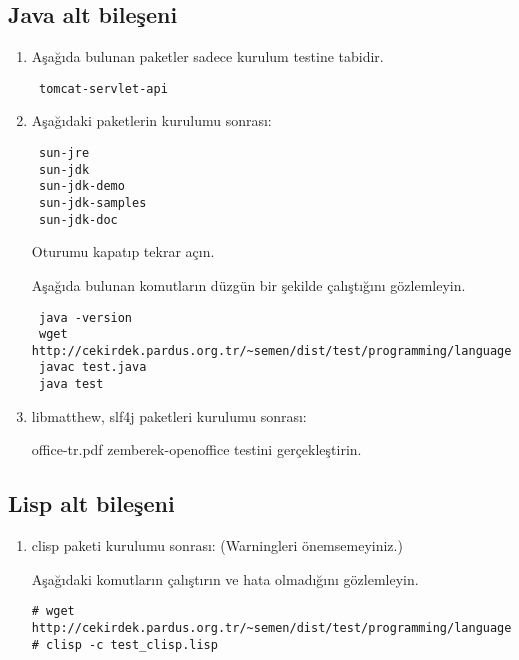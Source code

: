 \documentclass[a4paper,10pt]{article}
\begin{document}
\subsection{Java alt bileşeni}
\begin{enumerate}
\item Aşağıda bulunan paketler sadece kurulum testine tabidir.

\begin{verbatim}
 tomcat-servlet-api
\end{verbatim}

 \item Aşağıdaki paketlerin kurulumu sonrası:
\begin{verbatim}
 sun-jre
 sun-jdk
 sun-jdk-demo
 sun-jdk-samples
 sun-jdk-doc
\end{verbatim}

Oturumu kapatıp tekrar açın.

Aşağıda bulunan komutların düzgün bir şekilde çalıştığını gözlemleyin.
\begin{verbatim}
 java -version
 wget http://cekirdek.pardus.org.tr/~semen/dist/test/programming/language/java/test.java
 javac test.java
 java test
\end{verbatim}

\item libmatthew, slf4j paketleri kurulumu sonrası:

office-tr.pdf zemberek-openoffice testini gerçekleştirin.
\end{enumerate}



\subsection{Lisp alt bileşeni}
\begin{enumerate}
 \item clisp paketi kurulumu sonrası: (Warningleri önemsemeyiniz.)

Aşağıdaki komutların çalıştırın ve hata olmadığını gözlemleyin.
\begin{verbatim}
# wget http://cekirdek.pardus.org.tr/~semen/dist/test/programming/language/lisp/test_clisp.lisp 
# clisp -c test_clisp.lisp
\end{verbatim}

\end{enumerate}
\end{document}
